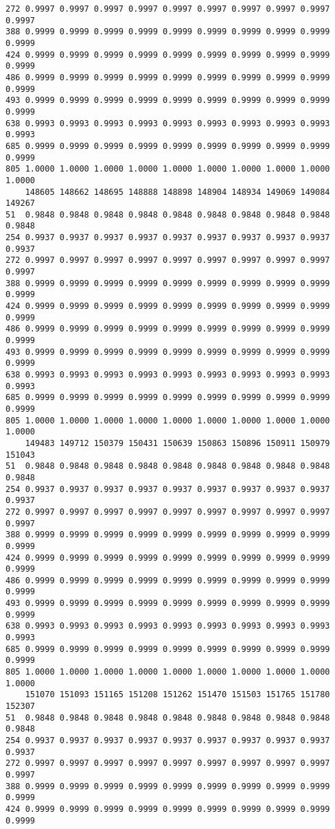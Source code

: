 \documentclass[
]{report}
\begin{document}
\begin{verbatim}
272 0.9997 0.9997 0.9997 0.9997 0.9997 0.9997 0.9997 0.9997 0.9997 0.9997
388 0.9999 0.9999 0.9999 0.9999 0.9999 0.9999 0.9999 0.9999 0.9999 0.9999
424 0.9999 0.9999 0.9999 0.9999 0.9999 0.9999 0.9999 0.9999 0.9999 0.9999
486 0.9999 0.9999 0.9999 0.9999 0.9999 0.9999 0.9999 0.9999 0.9999 0.9999
493 0.9999 0.9999 0.9999 0.9999 0.9999 0.9999 0.9999 0.9999 0.9999 0.9999
638 0.9993 0.9993 0.9993 0.9993 0.9993 0.9993 0.9993 0.9993 0.9993 0.9993
685 0.9999 0.9999 0.9999 0.9999 0.9999 0.9999 0.9999 0.9999 0.9999 0.9999
805 1.0000 1.0000 1.0000 1.0000 1.0000 1.0000 1.0000 1.0000 1.0000 1.0000
    148605 148662 148695 148888 148898 148904 148934 149069 149084 149267
51  0.9848 0.9848 0.9848 0.9848 0.9848 0.9848 0.9848 0.9848 0.9848 0.9848
254 0.9937 0.9937 0.9937 0.9937 0.9937 0.9937 0.9937 0.9937 0.9937 0.9937
272 0.9997 0.9997 0.9997 0.9997 0.9997 0.9997 0.9997 0.9997 0.9997 0.9997
388 0.9999 0.9999 0.9999 0.9999 0.9999 0.9999 0.9999 0.9999 0.9999 0.9999
424 0.9999 0.9999 0.9999 0.9999 0.9999 0.9999 0.9999 0.9999 0.9999 0.9999
486 0.9999 0.9999 0.9999 0.9999 0.9999 0.9999 0.9999 0.9999 0.9999 0.9999
493 0.9999 0.9999 0.9999 0.9999 0.9999 0.9999 0.9999 0.9999 0.9999 0.9999
638 0.9993 0.9993 0.9993 0.9993 0.9993 0.9993 0.9993 0.9993 0.9993 0.9993
685 0.9999 0.9999 0.9999 0.9999 0.9999 0.9999 0.9999 0.9999 0.9999 0.9999
805 1.0000 1.0000 1.0000 1.0000 1.0000 1.0000 1.0000 1.0000 1.0000 1.0000
    149483 149712 150379 150431 150639 150863 150896 150911 150979 151043
51  0.9848 0.9848 0.9848 0.9848 0.9848 0.9848 0.9848 0.9848 0.9848 0.9848
254 0.9937 0.9937 0.9937 0.9937 0.9937 0.9937 0.9937 0.9937 0.9937 0.9937
272 0.9997 0.9997 0.9997 0.9997 0.9997 0.9997 0.9997 0.9997 0.9997 0.9997
388 0.9999 0.9999 0.9999 0.9999 0.9999 0.9999 0.9999 0.9999 0.9999 0.9999
424 0.9999 0.9999 0.9999 0.9999 0.9999 0.9999 0.9999 0.9999 0.9999 0.9999
486 0.9999 0.9999 0.9999 0.9999 0.9999 0.9999 0.9999 0.9999 0.9999 0.9999
493 0.9999 0.9999 0.9999 0.9999 0.9999 0.9999 0.9999 0.9999 0.9999 0.9999
638 0.9993 0.9993 0.9993 0.9993 0.9993 0.9993 0.9993 0.9993 0.9993 0.9993
685 0.9999 0.9999 0.9999 0.9999 0.9999 0.9999 0.9999 0.9999 0.9999 0.9999
805 1.0000 1.0000 1.0000 1.0000 1.0000 1.0000 1.0000 1.0000 1.0000 1.0000
    151070 151093 151165 151208 151262 151470 151503 151765 151780 152307
51  0.9848 0.9848 0.9848 0.9848 0.9848 0.9848 0.9848 0.9848 0.9848 0.9848
254 0.9937 0.9937 0.9937 0.9937 0.9937 0.9937 0.9937 0.9937 0.9937 0.9937
272 0.9997 0.9997 0.9997 0.9997 0.9997 0.9997 0.9997 0.9997 0.9997 0.9997
388 0.9999 0.9999 0.9999 0.9999 0.9999 0.9999 0.9999 0.9999 0.9999 0.9999
424 0.9999 0.9999 0.9999 0.9999 0.9999 0.9999 0.9999 0.9999 0.9999 0.9999

\end{verbatim}
\end{document}
